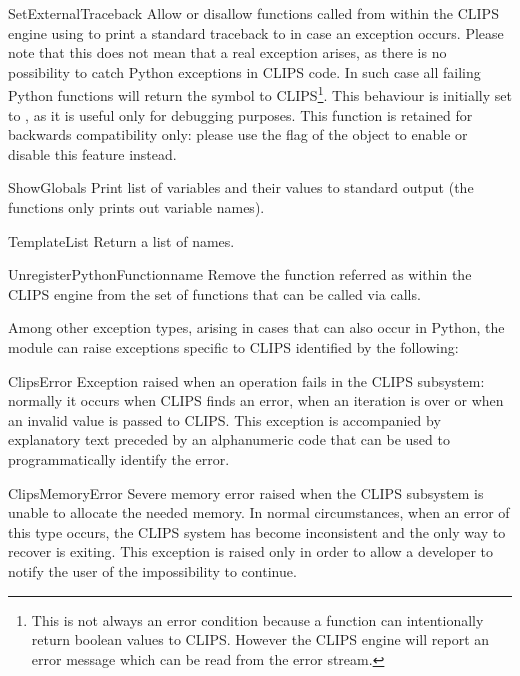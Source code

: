 \begin{funcdesc}{SetExternalTraceback}{}
Allow or disallow functions called from within the CLIPS engine using
 to print a standard traceback to  in
case an exception occurs. Please note that this does not mean that a
real exception arises, as there is no possibility to catch Python
exceptions in CLIPS code. In such case all failing Python functions will
return the symbol  to CLIPS\footnote{This is not always an
error condition because a function can intentionally return boolean
values to CLIPS. However the CLIPS engine will report an error message
which can be read from the error stream.}. This behaviour is initially
set to , as it is useful only for debugging purposes.
This function is retained for backwards compatibility only: please use the
 flag of the  object to enable or
disable this feature instead.
\end{funcdesc}

\begin{funcdesc}{ShowGlobals}{}
Print list of  variables and their values to standard
output (the  functions only prints out
 variable names).
\end{funcdesc}

\begin{funcdesc}{TemplateList}{}
Return a list of  names.
\end{funcdesc}

\begin{funcdesc}{UnregisterPythonFunction}{name}
Remove the function referred as  within the CLIPS engine from
the set of functions that can be called via  calls.
\end{funcdesc}


Among other exception types, arising in cases that can also occur in
Python, the \pyclips{} module can raise exceptions specific to CLIPS
identified by the following:

\begin{excdesc}{ClipsError}
Exception raised when an operation fails in the CLIPS subsystem: normally
it occurs when CLIPS finds an error, when an iteration is over or when an
invalid value is passed to CLIPS. This exception is accompanied by
explanatory text preceded by an alphanumeric code that can be used
to programmatically identify the error.
\end{excdesc}

\begin{excdesc}{ClipsMemoryError}
Severe memory error raised when the CLIPS subsystem is unable to allocate
the needed memory. In normal circumstances, when an error of this type
occurs, the CLIPS system has become inconsistent and the only way to
recover is exiting. This exception is raised only in order to allow a
developer to notify the user of the impossibility to continue.
\end{excdesc}


\begin{seealso}
\sclipsapg{}
\sclipsbpg{}
\end{seealso}


